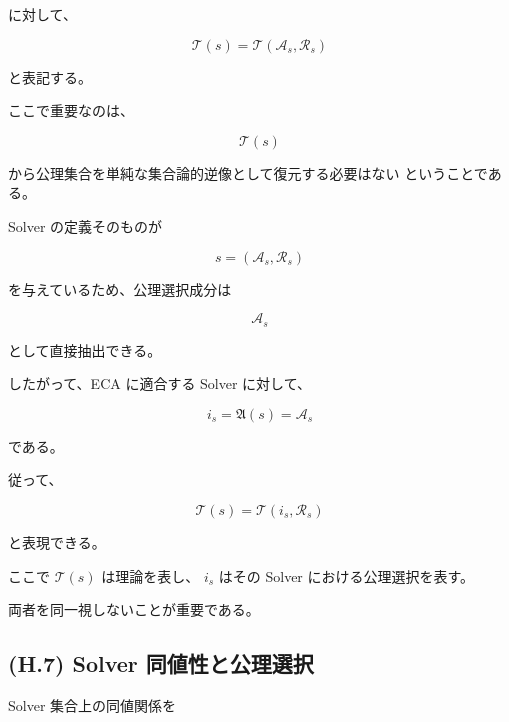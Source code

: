 \documentclass[a4paper,11pt]{article}
\begin{document}
に対して、

\begin{equation}
    \mathcal{T}(s)
    =
    \mathcal{T}(\mathcal{A}_s,\mathcal{R}_s)
    \label{eq:H-theory-decomposition}
\end{equation}

と表記する。

ここで重要なのは、

\begin{equation}
    \mathcal{T}(s)
\end{equation}

から公理集合を単純な集合論的逆像として復元する必要はない
ということである。

Solver の定義そのものが

\begin{equation}
    s=(\mathcal{A}_s,\mathcal{R}_s)
\end{equation}

を与えているため、公理選択成分は

\begin{equation}
    \mathcal{A}_s
\end{equation}

として直接抽出できる。

したがって、ECA に適合する Solver に対して、

\begin{equation}
    \boxed{
        i_s
        =
        \mathfrak{A}(s)
        =
        \mathcal{A}_s
    }
    \label{eq:H-theory-axiom}
\end{equation}

である。

従って、

\begin{equation}
    \boxed{
        \mathcal{T}(s)
        =
        \mathcal{T}(i_s,\mathcal{R}_s)
    }
    \label{eq:H-theory-is}
\end{equation}

と表現できる。

ここで $\mathcal{T}(s)$ は理論を表し、
$i_s$ はその Solver における公理選択を表す。

両者を同一視しないことが重要である。


\subsection{(H.7) Solver 同値性と公理選択}
\label{subsec:H7}

Solver 集合上の同値関係を
\end{document}
